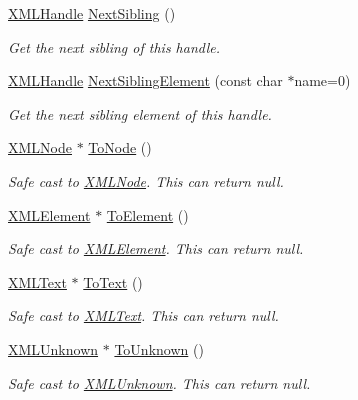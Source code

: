 \begin{DoxyCompactItemize}
\mbox{\hyperlink{classtinyxml2_1_1_x_m_l_handle}{X\+M\+L\+Handle}} \mbox{\hyperlink{classtinyxml2_1_1_x_m_l_handle_aad2eccc7c7c7b18145877c978c3850b5}{Next\+Sibling}} ()
\begin{DoxyCompactList}\small\item\em Get the next sibling of this handle. \end{DoxyCompactList}\item 
\mbox{\hyperlink{classtinyxml2_1_1_x_m_l_handle}{X\+M\+L\+Handle}} \mbox{\hyperlink{classtinyxml2_1_1_x_m_l_handle_ae41d88ee061f3c49a081630ff753b2c5}{Next\+Sibling\+Element}} (const char $\ast$name=0)
\begin{DoxyCompactList}\small\item\em Get the next sibling element of this handle. \end{DoxyCompactList}\item 
\mbox{\hyperlink{classtinyxml2_1_1_x_m_l_node}{X\+M\+L\+Node}} $\ast$ \mbox{\hyperlink{classtinyxml2_1_1_x_m_l_handle_a03ea6ec970a021b71bf1219a0f6717df}{To\+Node}} ()
\begin{DoxyCompactList}\small\item\em Safe cast to \mbox{\hyperlink{classtinyxml2_1_1_x_m_l_node}{X\+M\+L\+Node}}. This can return null. \end{DoxyCompactList}\item 
\mbox{\hyperlink{classtinyxml2_1_1_x_m_l_element}{X\+M\+L\+Element}} $\ast$ \mbox{\hyperlink{classtinyxml2_1_1_x_m_l_handle_a5e73ed8f3f6f9619d5a8bb1862c47d99}{To\+Element}} ()
\begin{DoxyCompactList}\small\item\em Safe cast to \mbox{\hyperlink{classtinyxml2_1_1_x_m_l_element}{X\+M\+L\+Element}}. This can return null. \end{DoxyCompactList}\item 
\mbox{\hyperlink{classtinyxml2_1_1_x_m_l_text}{X\+M\+L\+Text}} $\ast$ \mbox{\hyperlink{classtinyxml2_1_1_x_m_l_handle_a6ab9e8cbfb41417246e5657e3842c62a}{To\+Text}} ()
\begin{DoxyCompactList}\small\item\em Safe cast to \mbox{\hyperlink{classtinyxml2_1_1_x_m_l_text}{X\+M\+L\+Text}}. This can return null. \end{DoxyCompactList}\item 
\mbox{\hyperlink{classtinyxml2_1_1_x_m_l_unknown}{X\+M\+L\+Unknown}} $\ast$ \mbox{\hyperlink{classtinyxml2_1_1_x_m_l_handle_aa387368a1ad8d843a9f12df863d298de}{To\+Unknown}} ()
\begin{DoxyCompactList}\small\item\em Safe cast to \mbox{\hyperlink{classtinyxml2_1_1_x_m_l_unknown}{X\+M\+L\+Unknown}}. This can return null. \end{DoxyCompactList}\item 

\end{DoxyCompactItemize}
